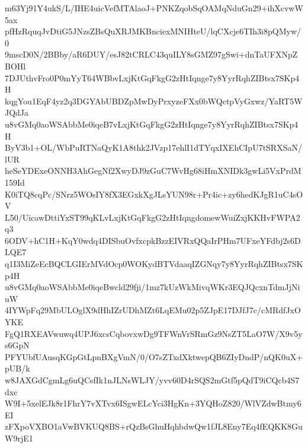 m63Yj91Y4ukS/L/IHE4uicVefMTAlaoJ+PNKZqobSqOAMqNduGn29+ihXcvwW5ax
pfHzRquqJvDtiG5JNzsZBsQuXRJMKBnciexMNIHteU/lqCXcje6TIh3i8pQMyw/0
9mscD0N/2BBby/aR6DUY/esJ82tCRLC43quILY8sGMZ97gSwi+dnTaUFXNpZBOHl
7DJUthvFro0P0mYyT64WBbvLxjKtGqFkgG2zHtIqnge7y8YyrRqhZIBtsx7SKp4H
kqgYou1EqF4yz2q3DGYAbUBDZpMwDyPrxyzeFXx0bWQctpVyGxwz/YaRT5WJQdJa
u8vGMq0aoWSAbbMe0iqeB7vLxjKtGqFkgG2zHtIqnge7y8YyrRqhZIBtsx7SKp4H
ByV3b1+OL/WbPuRTNaQyK1A8thk2JVzp17ehlI1dTYqxIXEhCIpU7tSRXSaN/lUR
heSeYDExeONNH3AhGegNf2XwyDJ9zGuC7WvHg68iHmXNIDk3gwLi5VxPrdM159Id
K0iTQ8cqPc/SNrz5WOsIY8fX3EGxkXgJLsYUN98r+Pr4ic+zy6hedKJgR1uC4sOV
L50/UicawDttiYxST99qKLvLxjKtGqFkgG2zHtIqngdomewWuiZxjKKHvFWPA2q3
6ODV+hC1H+KqY0wdq4DISbuOvfxcpkBzzEIVRxQQaIrPHm7UFxeYFdbj2s6DLQE7
q1I3MiZeEcBQCLGIErMVdOcp0WOKydBTVdaaqIZGNqy7y8YyrRqhZIBtsx7SKp4H
u8vGMq0aoWSAbbMe0iqeBwcld29fji/1mz7kUzWkMivqWKr3EQJQcxnTdmJjNiuW
4IYWpFq29MbULOglX9dHhIZrUDhMZt6LqEMu02p5ZJpE17DJfJ7c/cMRdfJxOYKE
FgQ1RXEAVwuwq4UPJ6xcsCqbovxwDg9TFWnVrSRmGz9NsZT5LaO7W/X9v5ys6GpN
PFYUbfUAusqKGpGtLpnBXgVmN/0/O7sZTxdXktwepQB6ZIyDndP/nQK0uX+pUB/k
w8JAXGdCgmLg6uQCsfIk1nJLNsWLJY/yvv60D4rSQS2mGtf5pQdT9iCQcb4S7dxc
W9I+5xelEJk8r1FhrY7vXTvx6ISgwELcYci3HgKn+3YQHoZ820/WlVZdwBtmy6EI
zFXpoVXBO1aVwBVKUQ8BS+rQzBsGhuHqhbdwQw1fJL8Eny7Eq4fEQKK8GuW9rjE1
